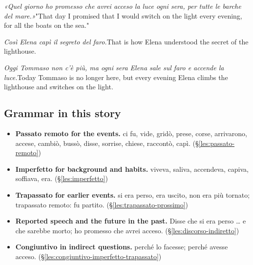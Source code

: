 \documentclass[11pt,a4paper,twoside,openright]{book}
\begin{document}
\begin{sentences}
\item\relax \textit{«Quel giorno ho promesso che avrei acceso la luce ogni sera, per tutte le barche del mare.»}\newline "That day I promised that I would switch on the light every evening, for all the boats on the sea."
\item\relax \textit{Così Elena capì il segreto del faro.}\newline That is how Elena understood the secret of the lighthouse.
\item\relax \textit{Oggi Tommaso non c'è più, ma ogni sera Elena sale sul faro e accende la luce.}\newline Today Tommaso is no longer here, but every evening Elena climbs the lighthouse and switches on the light.
\end{sentences}
\subsection*{Grammar in this story}
\begin{itemize}
\item\relax \textbf{Passato remoto for the events.} ci fu, vide, gridò, prese, corse, arrivarono, accese, cambiò, bussò, disse, sorrise, chiese, raccontò, capì. (\S\ref{les:passato-remoto})
\item\relax \textbf{Imperfetto for background and habits.} viveva, saliva, accendeva, capiva, soffiava, era. (\S\ref{les:imperfetto})
\item\relax \textbf{Trapassato for earlier events.} si era perso, era uscito, non era più tornato; trapassato remoto: fu partito. (\S\ref{les:trapassato-prossimo})
\item\relax \textbf{Reported speech and the future in the past.} Disse che si era perso … e che sarebbe morto; ho promesso che avrei acceso. (\S\ref{les:discorso-indiretto})
\item\relax \textbf{Congiuntivo in indirect questions.} perché lo facesse; perché avesse acceso. (\S\ref{les:congiuntivo-imperfetto-trapassato})
\end{itemize}
\end{document}
